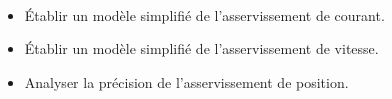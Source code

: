 \documentclass[10pt,fleqn]{article} %
\begin{document}
\begin{multicols}{2}
\begin{obj} ~\\
%
\begin{itemize}
\item Établir un modèle simplifié de l'asservissement de courant.
\item Établir un modèle simplifié de l'asservissement de vitesse.
\item Analyser la précision de l'asservissement de position.
\end{itemize}
\end{obj}
%
%
%
%
%
%
%
%
%
%
%
%
%

\end{multicols}
\end{document}
